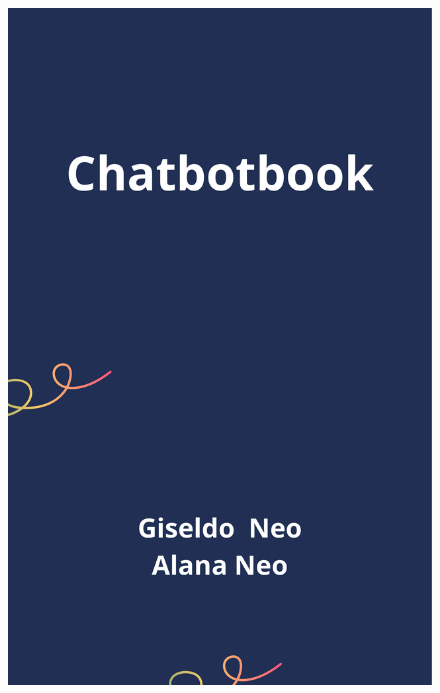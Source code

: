 \documentclass[14pt,a4paper,oneside]{book}
\begin{document}
\newpage


\clearpage            
\thispagestyle{empty} 
\begin{figure}[p]
	\centering
	\vspace*{-1.5in} %
	\hspace*{-0.82in} %
	\includegraphics[width=\paperwidth, height=\paperheight]{capa.pdf}
\end{figure}
\clearpage     
\end{document}
